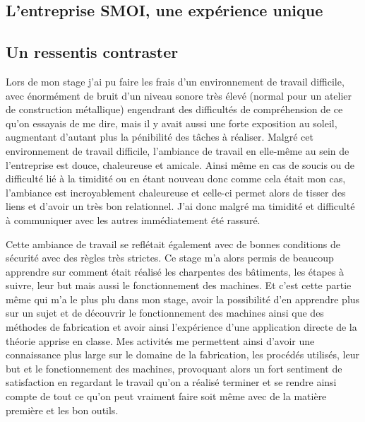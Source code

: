 \newpage
\begin{center}
    \section{L'entreprise SMOI, une expérience unique}
\end{center}

\subsection{Un ressentis contraster}

Lors de mon stage j'ai pu faire les frais d'un environnement de travail difficile, avec énormément de bruit d'un niveau sonore très élevé (normal pour un atelier de construction métallique) engendrant des difficultés de compréhension de ce qu'on essayais de me dire, mais il y avait aussi une forte exposition au soleil, augmentant d'autant plus la pénibilité des tâches à réaliser.\newline
Malgré cet environnement de travail difficile, l'ambiance de travail en elle-même au sein de l'entreprise est douce, chaleureuse et amicale. Ainsi même en cas de soucis ou de difficulté lié à la timidité ou en étant nouveau donc comme cela était mon cas, l'ambiance est incroyablement chaleureuse et celle-ci permet alors de tisser des liens et d'avoir un très bon relationnel. J'ai donc malgré ma timidité et difficulté à communiquer avec les autres immédiatement été rassuré.\newline

Cette ambiance de travail se reflétait également avec de bonnes conditions de sécurité avec des règles très strictes. Ce stage m'a alors permis de beaucoup apprendre sur comment était réalisé les charpentes des bâtiments, les étapes à suivre, leur but mais aussi le fonctionnement des machines. Et c'est cette partie même qui m'a le plus plu dans mon stage, avoir la possibilité d'en apprendre plus sur un sujet et de découvrir le fonctionnement des machines ainsi que des méthodes de fabrication et avoir ainsi l'expérience d'une application directe de la théorie apprise en classe.\newline
Mes activités me permettent ainsi d'avoir une connaissance plus large sur le domaine de la fabrication, les procédés utilisés, leur but et le fonctionnement des machines, provoquant alors un fort sentiment de satisfaction en regardant le travail qu'on a réalisé terminer et se rendre ainsi compte de tout ce qu'on peut vraiment faire soit même avec de la matière première et les bon outils.\newline

